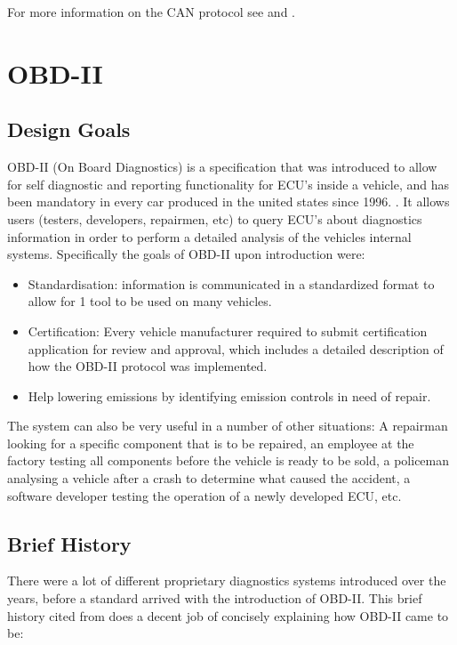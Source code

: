 For more information on the CAN protocol see \cite{ISO11898-2} and \cite{ISO11898-3}.

\section{OBD-II}
\label{sec:obd}

\subsection{Design Goals} 
\label{subsec:obd:design_goal}

OBD-II (On Board Diagnostics) is a specification that was introduced to allow for self diagnostic and reporting functionality for ECU's inside a vehicle, and has been mandatory in every car produced in the united states since 1996. \cite{wiki:OBD}. It allows users (testers, developers, repairmen, etc) to query ECU's about diagnostics information in order to perform a detailed analysis of the vehicles internal systems. Specifically the goals of OBD-II upon introduction were: 
\begin{itemize}
	\item Standardisation: information is communicated in a standardized format to allow for 1 tool to be used on many vehicles.
	\item Certification: Every vehicle manufacturer required to submit certification application for review and approval, which includes a detailed description of how the OBD-II protocol was implemented.
	\item Help lowering emissions by identifying emission controls in need of repair.
\end{itemize} 
The system can also be very useful in a number of other situations: A repairman looking for a specific component that is to be repaired, an employee at the factory testing all components before the vehicle is ready to be sold, a policeman analysing a vehicle after a crash to determine what caused the accident, a software developer testing the operation of a newly developed ECU, etc. 
\newline

\subsection{Brief History}
\label{subsec:obd:brief_history} 

There were a lot of different proprietary diagnostics systems introduced over the years, before a standard arrived with the introduction of OBD-II. This brief history cited from \cite{OBDhistory} does a decent job of concisely explaining how OBD-II came to be:

